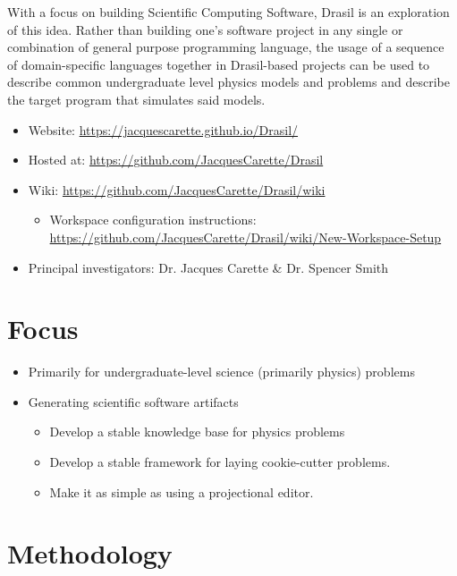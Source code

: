 
With a focus on building Scientific Computing Software, Drasil is an exploration
of this idea. Rather than building one's software project in any single or
combination of general purpose programming language, the usage of a sequence of
domain-specific languages together in Drasil-based projects can be used to
describe common undergraduate level physics models and problems and describe the
target program that simulates said models.

\begin{itemize}
    \item Website: \url{https://jacquescarette.github.io/Drasil/}
    \item Hosted at: \url{https://github.com/JacquesCarette/Drasil}
    \item Wiki: \url{https://github.com/JacquesCarette/Drasil/wiki}
          \begin{itemize}
              \item Workspace configuration instructions:
              \url{https://github.com/JacquesCarette/Drasil/wiki/New-Workspace-Setup}
          \end{itemize}
    \item Principal investigators: Dr. Jacques Carette \& Dr. Spencer Smith
\end{itemize}

\section{Focus}

\begin{itemize}
    \item Primarily for undergraduate-level science (primarily physics) problems
    \item Generating scientific software artifacts
          \begin{itemize}
              \item Develop a stable knowledge base for physics problems
              \item Develop a stable framework for laying cookie-cutter problems.
              \item Make it as simple as using a projectional editor.
          \end{itemize}
\end{itemize}

\section{Methodology}

